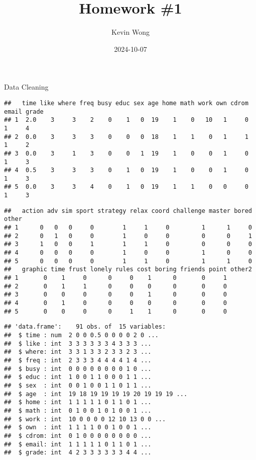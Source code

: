 \documentclass[
]{article}
\title{Homework \#1}
\author{Kevin Wong}
\date{2024-10-07}
\begin{document}
\maketitle

Data Cleaning

\begin{verbatim}
##   time like where freq busy educ sex age home math work own cdrom email grade
## 1  2.0    3     3    2    0    1   0  19    1    0   10   1     0     1     4
## 2  0.0    3     3    3    0    0   0  18    1    1    0   1     1     1     2
## 3  0.0    3     1    3    0    0   1  19    1    0    0   1     0     1     3
## 4  0.5    3     3    3    0    1   0  19    1    0    0   1     0     1     3
## 5  0.0    3     3    4    0    1   0  19    1    1    0   0     0     1     3
\end{verbatim}

\begin{verbatim}
##   action adv sim sport strategy relax coord challenge master bored other
## 1      0   0   0     0        1     1     0         1      1     0      
## 2      0   1   0     0        1     0     0         0      0     1      
## 3      1   0   0     1        1     1     0         0      0     0      
## 4      0   0   0     0        1     0     0         1      0     0      
## 5      0   0   0     0        1     1     0         1      1     0      
##   graphic time frust lonely rules cost boring friends point other2
## 1       0    1     0      0     0    1      0       0     1       
## 2       0    1     1      0     0    0      0       0     0       
## 3       0    0     0      0     0    1      0       0     0       
## 4       0    1     0      0     0    0      0       0     0       
## 5       0    0     0      0     1    1      0       0     0
\end{verbatim}

\begin{verbatim}
## 'data.frame':    91 obs. of  15 variables:
##  $ time : num  2 0 0 0.5 0 0 0 0 2 0 ...
##  $ like : int  3 3 3 3 3 3 4 3 3 3 ...
##  $ where: int  3 3 1 3 3 2 3 3 2 3 ...
##  $ freq : int  2 3 3 3 4 4 4 4 1 4 ...
##  $ busy : int  0 0 0 0 0 0 0 0 1 0 ...
##  $ educ : int  1 0 0 1 1 0 0 0 1 1 ...
##  $ sex  : int  0 0 1 0 0 1 1 0 1 1 ...
##  $ age  : int  19 18 19 19 19 19 20 19 19 19 ...
##  $ home : int  1 1 1 1 1 0 1 1 0 1 ...
##  $ math : int  0 1 0 0 1 0 1 0 0 1 ...
##  $ work : int  10 0 0 0 0 12 10 13 0 0 ...
##  $ own  : int  1 1 1 1 0 0 1 0 0 1 ...
##  $ cdrom: int  0 1 0 0 0 0 0 0 0 0 ...
##  $ email: int  1 1 1 1 1 0 1 1 0 1 ...
##  $ grade: int  4 2 3 3 3 3 3 3 4 4 ...
\end{verbatim}
\end{document}
